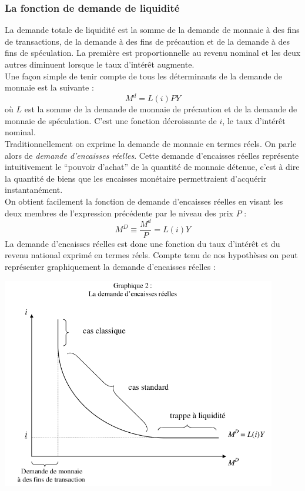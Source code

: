 \documentclass[10pt]{book}
\begin{document}
\subsubsection{La fonction de demande de liquidité}
La demande totale de liquidité est la somme de la demande de monnaie à des fins de transactions, de la demande à des fins de précaution et de la demande à des fins de spéculation. La première est proportionnelle au revenu nominal et les deux autres diminuent lorsque le taux d'intérêt augmente. \\
Une façon simple de tenir compte de tous les déterminants de la demande de monnaie est la suivante :
$$M^d = L(i)PY$$
où $L$ est la somme de la demande de monnaie de précaution et de la demande de monnaie de spéculation. C'est une fonction décroissante de $i$, le taux d'intérêt nominal.  \\
Traditionnellement on exprime la demande de monnaie en termes réels. On parle alors de \textit{demande d'encaisses réelles}. Cette demande d'encaisses réelles représente intuitivement le ``pouvoir d'achat'' de la quantité de monnaie détenue, c'est à dire la quantité de biens que les encaisses monétaire permettraient d'acquérir instantanément. \\
On obtient facilement la fonction de demande d'encaisses réelles en visant les deux membres de l'expression précédente par le niveau des prix $P$ :
$$M^D \equiv \frac{M^d}{P} = L(i)Y$$
La demande d'encaisses réelles est donc une fonction du taux d'intérêt et du revenu national exprimé en termes réels. Compte tenu de nos hypothèses on peut représenter graphiquement la demande d'encaisses réelles :
\begin{center}
  \includegraphics[width=12cm]{graph17.png}
\end{center}
\end{document}
